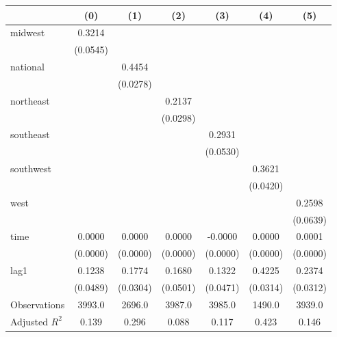 \begin{tabular}{lcccccc}
\toprule
 & (0) & (1) & (2) & (3) & (4) & (5) \\
\midrule
midwest & 0.3214 &  &  &  &  &  \\
\vspace{0.2cm}
 & (0.0545) &  &  &  &  &  \\
national &  & 0.4454 &  &  &  &  \\
\vspace{0.2cm}
 &  & (0.0278) &  &  &  &  \\
northeast &  &  & 0.2137 &  &  &  \\
\vspace{0.2cm}
 &  &  & (0.0298) &  &  &  \\
southeast &  &  &  & 0.2931 &  &  \\
\vspace{0.2cm}
 &  &  &  & (0.0530) &  &  \\
southwest &  &  &  &  & 0.3621 &  \\
\vspace{0.2cm}
 &  &  &  &  & (0.0420) &  \\
west &  &  &  &  &  & 0.2598 \\
\vspace{0.2cm}
 &  &  &  &  &  & (0.0639) \\
time & 0.0000 & 0.0000 & 0.0000 & -0.0000 & 0.0000 & 0.0001 \\
\vspace{0.2cm}
 & (0.0000) & (0.0000) & (0.0000) & (0.0000) & (0.0000) & (0.0000) \\
lag1 & 0.1238 & 0.1774 & 0.1680 & 0.1322 & 0.4225 & 0.2374 \\
\vspace{0.2cm}
 & (0.0489) & (0.0304) & (0.0501) & (0.0471) & (0.0314) & (0.0312) \\
\midrule
Observations & 3993.0 & 2696.0 & 3987.0 & 3985.0 & 1490.0 & 3939.0 \\
Adjusted $R^2$ & 0.139 & 0.296 & 0.088 & 0.117 & 0.423 & 0.146 \\
\bottomrule
\end{tabular}